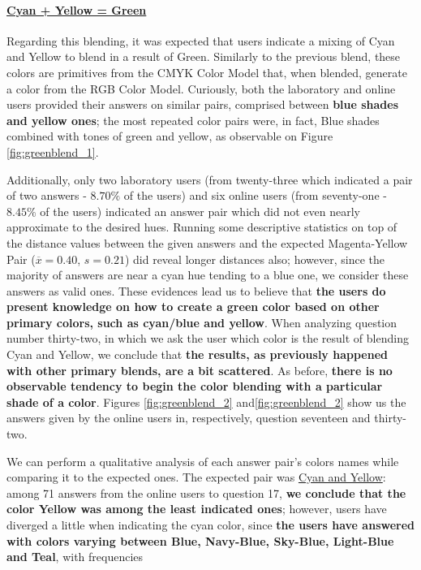 \paragraph{\ul{Cyan + Yellow = Green}}
%
Regarding this blending, it was expected that users indicate a mixing of Cyan and Yellow to blend in a result of Green. Similarly to the previous blend, these colors are primitives from the CMYK Color Model that, when blended,
generate a color from the RGB Color Model. Curiously, both the laboratory and online users provided their answers on similar pairs, comprised between \textbf{blue shades and yellow ones}; the most repeated
color pairs were, in fact, Blue shades combined with tones of green and yellow, as observable on Figure \ref{fig:greenblend_1}. \par
%
Additionally, only two laboratory users (from twenty-three which indicated a pair of two answers - $8.70\%$ of the users) and six online users (from seventy-one - $8.45\%$ of the users) indicated an answer pair which did not even
nearly approximate to the desired hues. Running some descriptive statistics on top of the distance values between the given answers and the expected Magenta-Yellow Pair ($\overline{x} = 0.40$, $s = 0.21$) did reveal longer distances
also; however, since the majority of answers are near a cyan hue tending to a blue one, we consider these answers as valid ones. These evidences lead us to believe that \textbf{the users do present knowledge on how to create a green color
based on other primary colors, such as cyan/blue and yellow}.
When analyzing question number thirty-two, in which we ask the user which color is the result of blending Cyan and Yellow, we conclude that \textbf{the results, as previously happened with other primary blends, are a bit scattered}.
As before, \textbf{there is no observable tendency to begin the color blending with a particular shade of a color}. Figures \ref{fig:greenblend_2} and\ref{fig:greenblend_2} show us the answers given by the online users in, respectively,
question seventeen and thirty-two. \par
%
We can perform a qualitative analysis of each answer pair's colors names while comparing it to the expected ones. The
expected pair was \ul{Cyan and Yellow}: among 71 answers from the online users to question 17, \textbf{we conclude
that the color Yellow was among the least indicated ones}; however, users have diverged a little when indicating the cyan
color, since \textbf{the users have answered with colors varying between Blue, Navy-Blue, Sky-Blue, Light-Blue and Teal}, with frequencies
